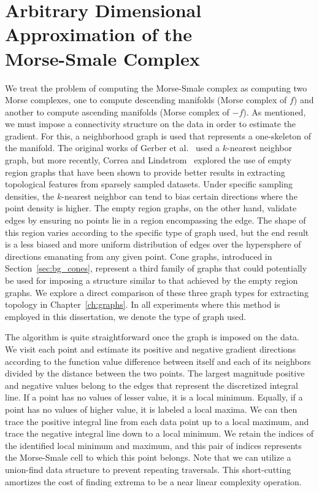 \clearpage
\section{Arbitrary Dimensional Approximation of the\\Morse-Smale Complex}
\label{sec:approximationMSC}

We treat the problem of computing the Morse-Smale complex as computing two Morse complexes, one to compute descending manifolds (Morse complex of $f$) and another to compute ascending manifolds (Morse complex of $-f$).
%
As mentioned, we must impose a connectivity structure on the data in order to estimate the gradient.
%
For this, a neighborhood graph is used that represents a one-skeleton of the manifold.
%
The original works of Gerber et al.~\cite{GerberBremerPascucci2010,GerberPotter2012,GerberRubelBremer2011} used a $k$-nearest neighbor graph, but more recently, Correa and Lindstrom~\cite{CorreaLindstrom2011} explored the use of empty region graphs that have been shown to provide better results in extracting topological features from sparsely sampled datasets.
%
Under specific sampling densities, the $k$-nearest neighbor can tend to bias certain directions where the point density is higher.
%
The empty region graphs, on the other hand, validate edges by ensuring no points lie in a region encompassing the edge.
%
The shape of this region varies according to the specific type of graph used, but the end result is a less biased and more uniform distribution of edges over the hypersphere of directions emanating from any given point.
%
Cone graphs, introduced in Section~\ref{sec:bg_cones}, represent a third family of graphs that could potentially be used for imposing a structure similar to that achieved by the empty region graphs.
%
We explore a direct comparison of these three graph types for extracting topology in Chapter~\ref{ch:graphs}.
%
In all experiments where this method is employed in this dissertation, we denote the type of graph used.

The algorithm is quite straightforward once the graph is imposed on the data.
%
We visit each point and estimate its positive and negative gradient directions according to the function value difference between itself and each of its neighbors divided by the distance between the two points.
%
The largest magnitude positive and negative values belong to the edges that represent the discretized integral line.
%
If a point has no values of lesser value, it is a local minimum.
%
Equally, if a point has no values of higher value, it is labeled a local maxima.
%
We can then trace the positive integral line from each data point up to a local maximum, and trace the negative integral line down to a local minimum.
%
We retain the indices of the identified local minimum and maximum, and this pair of indices represents the Morse-Smale cell to which this point belongs.
%
Note that we can utilize a union-find data structure to prevent repeating traversals.
%
This short-cutting amortizes the cost of finding extrema to be a near linear complexity operation.

